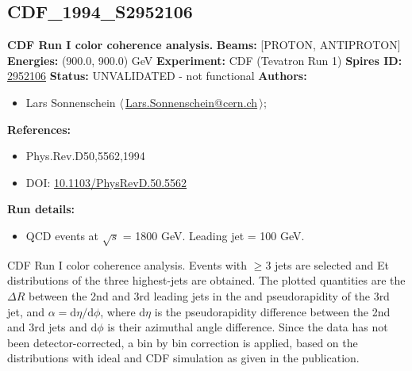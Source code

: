 \subsection[CDF\_1994\_S2952106]{CDF\_1994\_S2952106\,\cite{Abe:1994nj}}
\textbf{CDF Run I color coherence analysis.}\newline
\textbf{Beams:} [PROTON, ANTIPROTON] \newline
\textbf{Energies:} (900.0, 900.0) GeV \newline
\textbf{Experiment:} CDF (Tevatron Run 1) \newline
\textbf{Spires ID:} \href{http://www.slac.stanford.edu/spires/find/hep/www?rawcmd=key+2952106}{2952106}\newline
\textbf{Status:} UNVALIDATED - not functional\newline
\textbf{Authors:}
\begin{itemize}
  \item Lars Sonnenschein $\langle\,$\href{mailto:Lars.Sonnenschein@cern.ch}{Lars.Sonnenschein@cern.ch}$\,\rangle$;
\end{itemize}
\textbf{References:}
\begin{itemize}
  \item Phys.Rev.D50,5562,1994
  \item DOI: \href{http://dx.doi.org/10.1103/PhysRevD.50.5562}{10.1103/PhysRevD.50.5562}
\end{itemize}
\textbf{Run details:}
\begin{itemize}

  \item QCD events at \ensuremath{\sqrt{s}} = 1800 GeV. Leading jet \pTmin = 100 GeV.\end{itemize}

\noindent CDF Run I color coherence analysis. Events with $\ge 3$ jets are selected and Et distributions of the three highest-\pT jets are obtained. The plotted quantities are the $\Delta{R}$ between the 2nd and 3rd leading jets in the \pT and pseudorapidity of the 3rd jet, and $\alpha = \mathrm{d}{\eta}/\mathrm{d}{\phi}$, where $\mathrm{d}{\eta}$ is the pseudorapidity difference between the 2nd and 3rd jets and $\mathrm{d}{\phi}$ is their azimuthal angle difference.  Since the data has not been detector-corrected, a bin by bin correction is applied, based on the distributions with ideal and CDF simulation as given in the publication.

\clearpage


